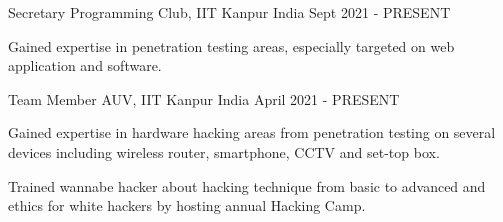 

\begin{cventries}

  \cventry
    {Secretary} %
    {Programming Club, IIT Kanpur} %
    {India} %
    {Sept 2021 - PRESENT} %
    {
      \begin{cvitems} %
        \item {Gained expertise in penetration testing areas, especially targeted on web application and software.}
      \end{cvitems}
    }
    
 \vspace{0.2cm}

  \cventry
    {Team Member} %
    {AUV, IIT Kanpur} %
    {India} %
    {April 2021 - PRESENT} %
    {
      \begin{cvitems} %
        \item {Gained expertise in hardware hacking areas from penetration testing on several devices including wireless router, smartphone, CCTV and set-top box.}
        \item {Trained wannabe hacker about hacking technique from basic to advanced and ethics for white hackers by hosting annual Hacking Camp.}
      \end{cvitems}
    }
    
 \vspace{0.2cm}

\end{cventries}
